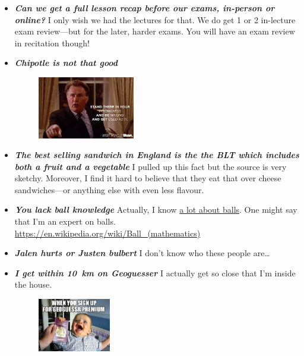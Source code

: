 \documentclass[11pt,letterpaper]{article}
\begin{document}
\begin{itemize}
\item {\bfseries\itshape Can we get a full lesson recap before our exams, in-person or online?} I only wish we had the lectures for that. We do get 1 or 2 in-lecture exam review---but for the later, harder exams. You will have an exam review in recitation though!

\item {\bfseries\itshape Chipotle is not that good} 
	\begin{figure}[H]
	\centering
	\includegraphics[width=0.40\textwidth]{images/wrong.jpeg}
	\end{figure}

\item {\bfseries\itshape The best selling sandwich in England is the the BLT which includes both a fruit and a vegetable} I pulled up this fact but the source is very sketchy. Moreover, I find it hard to believe that they eat that over cheese sandwiches---or anything else with even less flavour. 

\item {\bfseries\itshape You lack ball knowledge} Actually, I know \href{https://en.wikipedia.org/wiki/Ball\_(mathematics)}{a lot about balls}. One might say that I'm an expert on balls. \url{https://en.wikipedia.org/wiki/Ball\_(mathematics)}

\item {\bfseries\itshape Jalen hurts or Justen bulbert} I don't know who these people are\dots

\item {\bfseries\itshape I get within 10~km on Geoguesser} I actually get so close that I'm inside the house.
	\begin{figure}[H]
	\centering
	\includegraphics[width=0.30\textwidth]{images/geoguesser.jpeg}
	\end{figure}


\end{itemize}
\end{document}
